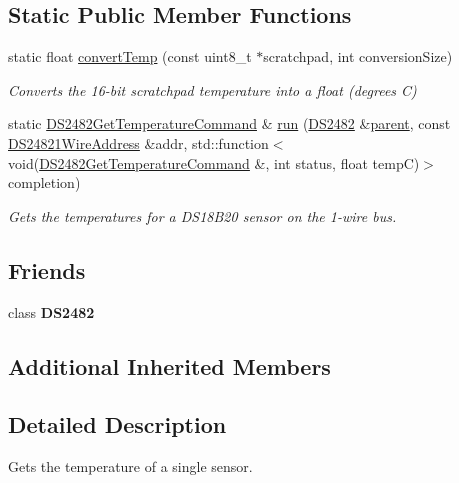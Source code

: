 \subsection*{Static Public Member Functions}
\begin{DoxyCompactItemize}
\item 
static float \mbox{\hyperlink{class_d_s2482_get_temperature_command_af5778f4b03a65c8dc1290516ac73fe92}{convert\+Temp}} (const uint8\+\_\+t $\ast$scratchpad, int conversion\+Size)
\begin{DoxyCompactList}\small\item\em Converts the 16-\/bit scratchpad temperature into a float (degrees C) \end{DoxyCompactList}\item 
static \mbox{\hyperlink{class_d_s2482_get_temperature_command}{D\+S2482\+Get\+Temperature\+Command}} \& \mbox{\hyperlink{class_d_s2482_get_temperature_command_a91c9ee5048047d209e3dd1effa1ba179}{run}} (\mbox{\hyperlink{class_d_s2482}{D\+S2482}} \&\mbox{\hyperlink{class_d_s2482_command_a54a41fb8a610ef2077f5e5377771aaf3}{parent}}, const \mbox{\hyperlink{class_d_s24821_wire_address}{D\+S24821\+Wire\+Address}} \&addr, std\+::function$<$ void(\mbox{\hyperlink{class_d_s2482_get_temperature_command}{D\+S2482\+Get\+Temperature\+Command}} \&, int status, float tempC)$>$ completion)
\begin{DoxyCompactList}\small\item\em Gets the temperatures for a D\+S18\+B20 sensor on the 1-\/wire bus. \end{DoxyCompactList}\end{DoxyCompactItemize}
\subsection*{Friends}
\begin{DoxyCompactItemize}
\item 
\mbox{\label{class_d_s2482_get_temperature_command_afeaf69274324e8dbeebede05c02d9c18}} 
class {\bfseries D\+S2482}
\end{DoxyCompactItemize}
\subsection*{Additional Inherited Members}


\subsection{Detailed Description}
Gets the temperature of a single sensor. 

